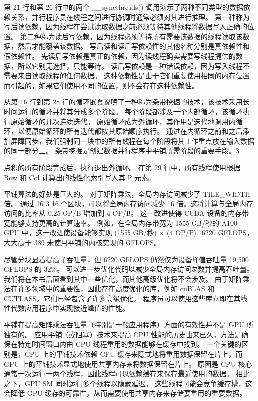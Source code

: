第 21 行和第 26 行中的两个 \_\_syncthreads() 调用演示了两种不同类型的数据依赖关系，并行程序员在线程之间进行协调时通常必须对其进行推理。 第一种称为写后读依赖，因为线程在尝试读取数据之前必须等待其他线程将数据写入正确的位置。 第二种称为读后写依赖，因为线程必须等待所有需要该数据的线程读取该数据，然后才能覆盖该数据。 写后读和读后写依赖性的其他名称分别是真依赖性和假依赖性。 先读后写依赖是真正的依赖，因为读线程确实需要写线程提供的数据，所以它别无选择，只能等待。 读后写依赖是一种错误依赖，因为写入线程不需要来自读取线程的任何数据。 这种依赖性是由于它们重复使用相同的内存位置而引起的，如果它们使用不同的位置，则不会存在这种依赖性。

从第 16 行到第 28 行的循环嵌套说明了一种称为条带挖掘的技术，该技术采用长时间运行的循环并将其分成多个阶段。 每个阶段都涉及一个内部循环，该循环执行原始循环的几次连续迭代。 原始循环成为外循环，其作用是迭代地调用内循环，以便原始循环的所有迭代都按其原始顺序执行。 通过在内循环之前和之后添加屏障同步，我们强制同一块中的所有线程在每个阶段将其工作重点放在输入数据的同一部分上。 条带挖掘是创建数据并行程序中平铺所需阶段的重要手段。3

点积的所有阶段完成后，执行退出外循环。 在第 29 行中，所有线程使用根据 Row 和 Col 计算出的线性化索引写入其 P 元素。

平铺算法的好处是巨大的。 对于矩阵乘法，全局内存访问减少了 TILE\_WIDTH 倍。 通过 16 3 16 个区块，可以将全局内存访问减少 16 倍。这将计算与全局内存访问的比率从 0.25 OP/B 增加到 4 OP/B。 这一改进使得 CUDA 设备的内存带宽能够支持更高的计算速率。 例如，在全局内存带宽为 1555 GB/秒的 A100 GPU 中，这一改进使设备能够实现 (1555 GB/秒) × (4 OP/B)=6220 GFLOPS，大大高于 389 未使用平铺的内核实现的 GFLOPS。

尽管分块显着提高了吞吐量，但 6220 GFLOPS 仍然仅为设备峰值吞吐量 19,500 GFLOPS 的 32\%。 可以进一步优化代码以减少全局内存访问次数并提高吞吐量。 我们将在本书后面看到其中一些优化，而其他高级优化将不会涉及。 由于矩阵乘法在许多领域中的重要性，因此存在高度优化的库，例如 cuBLAS 和 CUTLASS，它们已经包含了许多高级优化。 程序员可以使用这些库立即在其线性代数应用程序中实现接近峰值的性能。

平铺在提高矩阵乘法吞吐量（特别是一般应用程序）方面的有效性并不是 GPU 所独有的。 应用平铺（或阻塞）技术来提高 CPU 性能的历史由来已久，方法是确保在特定时间窗口内由 CPU 线程重用的数据能够在缓存中找到。 一个关键的区别是，CPU 上的平铺技术依赖 CPU 缓存来隐式地将重用数据保留在片上，而 GPU 上的平铺技术显式地使用共享内存来将数据保留在片上。 原因是 CPU 核心通常一次运行一两个线程，因此线程可以依赖缓存来保存最近使用的数据。 相比之下，GPU SM 同时运行多个线程以隐藏延迟。 这些线程可能会竞争缓存槽，这会降低 GPU 缓存的可靠性，从而需要使用共享内存来存储要重用的重要数据。

